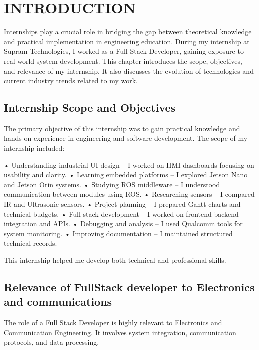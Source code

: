 \documentclass[12pt,a4paper]{report}
\begin{document}
\chapter{INTRODUCTION}
\label{ch:intro}


Internships play a crucial role in bridging the gap between theoretical knowledge and practical implementation in engineering education. During my internship at Supram Technologies, I worked as a Full Stack Developer, gaining exposure to real-world system development. This chapter introduces the scope, objectives, and relevance of my internship. It also discusses the evolution of technologies and current industry trends related to my work.


\section{Internship Scope and Objectives}

The primary objective of this internship was to gain practical knowledge and hands-on experience in engineering and software development. The scope of my internship included:


• Understanding industrial UI design – I worked on HMI dashboards focusing on usability and clarity. • Learning embedded platforms – I explored Jetson Nano and Jetson Orin systems. • Studying ROS middleware – I understood communication between modules using ROS. • Researching sensors – I compared IR and Ultrasonic sensors. • Project planning – I prepared Gantt charts and technical budgets. • Full stack development – I worked on frontend-backend integration and APIs. • Debugging and analysis – I used Qualcomm tools for system monitoring. • Improving documentation – I maintained structured technical records.


This internship helped me develop both technical and professional skills.


\section{Relevance of FullStack developer to Electronics and communications}

The role of a Full Stack Developer is highly relevant to Electronics and Communication Engineering. It involves system integration, communication protocols, and data processing.
\end{document}
